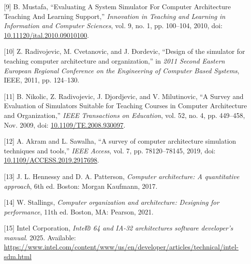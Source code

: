 \documentclass[12pt,oneside]{templates/unerthesis}
\newcommand{\CSLLeftMargin}[1]{#1} %
\newcommand{\CSLRightInline}[1]{#1} %
\newlength{\cslhangindent}
\newenvironment{CSLReferences}[2] %
 {\setlength{\parindent}{0pt}%
  \setlength{\leftskip}{#1 pt\relax}%
  \setlength{\parskip}{#2 pt\relax}%
  \everypar{\setlength{\hangindent}{\cslhangindent}}}
 {\par}
\begin{document}
\begin{CSLReferences}{0}{0}
\leavevmode{}%
\CSLLeftMargin{{[}9{]} }%
\CSLRightInline{B. Mustafa, {``Evaluating {A} {System} {Simulator} {For} {Computer} {Architecture} {Teaching} {And} {Learning} {Support},''} \emph{Innovation in Teaching and Learning in Information and Computer Sciences}, vol. 9, no. 1, pp. 100--104, 2010, doi: \href{https://doi.org/10.11120/ital.2010.09010100}{10.11120/ital.2010.09010100}.}

\leavevmode{}%
\CSLLeftMargin{{[}10{]} }%
\CSLRightInline{Z. Radivojevic, M. Cvetanovic, and J. Ðordevic, {``Design of the simulator for teaching computer architecture and organization,''} in \emph{2011 {Second} {Eastern} {European} {Regional} {Conference} on the {Engineering} of {Computer} {Based} {Systems}}, IEEE, 2011, pp. 124--130.}

\leavevmode{}%
\CSLLeftMargin{{[}11{]} }%
\CSLRightInline{B. Nikolic, Z. Radivojevic, J. Djordjevic, and V. Milutinovic, {``A {Survey} and {Evaluation} of {Simulators} {Suitable} for {Teaching} {Courses} in {Computer} {Architecture} and {Organization},''} \emph{IEEE Transactions on Education}, vol. 52, no. 4, pp. 449--458, Nov. 2009, doi: \href{https://doi.org/10.1109/TE.2008.930097}{10.1109/TE.2008.930097}.}

\leavevmode{}%
\CSLLeftMargin{{[}12{]} }%
\CSLRightInline{A. Akram and L. Sawalha, {``A survey of computer architecture simulation techniques and tools,''} \emph{IEEE Access}, vol. 7, pp. 78120--78145, 2019, doi: \href{https://doi.org/10.1109/ACCESS.2019.2917698}{10.1109/ACCESS.2019.2917698}.}

\leavevmode{}%
\CSLLeftMargin{{[}13{]} }%
\CSLRightInline{J. L. Hennessy and D. A. Patterson, \emph{Computer architecture: A quantitative approach}, 6th ed. Boston: Morgan Kaufmann, 2017.}

\leavevmode{}%
\CSLLeftMargin{{[}14{]} }%
\CSLRightInline{W. Stallings, \emph{Computer organization and architecture: Designing for performance}, 11th ed. Boston, MA: Pearson, 2021.}

\leavevmode{}%
\CSLLeftMargin{{[}15{]} }%
\CSLRightInline{Intel Corporation, \emph{Intel® 64 and IA-32 architectures software developer's manual}. 2025. Available: \url{https://www.intel.com/content/www/us/en/developer/articles/technical/intel-sdm.html}}


\end{CSLReferences}
\end{document}
